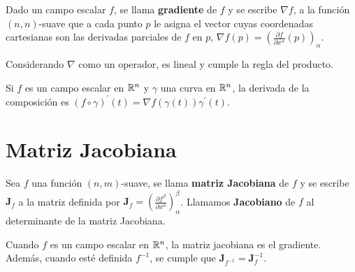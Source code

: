 \begin{definition}
  Dado un campo escalar $f$, se llama \textbf{gradiente}\label{def:gradiente} de $f$ y se escribe $\nabla
  f$, a la función $(n,n)$-suave que a cada punto $p$ le asigna el vector cuyas
  coordenadas cartesianas son las derivadas parciales de $f$ en $p$, $\nabla f(p)=\left({\frac
  {\partial f}{\partial x^\alpha}}(p)\right)_\alpha$.
\end{definition}

Considerando $\nabla$ como un operador, es lineal y cumple la regla del producto.

\begin{theorem}\label{th:regla-cadena}
  Si $f$ es un campo escalar en $\mathbb{R}^n$ y $\gamma$ una curva en $\mathbb{R}^n$, la derivada de la composición
es $(f\circ\gamma)^{'}(t)=\nabla f(\gamma(t))\gamma^{'}(t)$.
\end{theorem}

\section{Matriz Jacobiana}\label{sec:matriz-jacobiana}
\begin{definition}
  Sea $f$ una función $(n,m)$-suave, se llama \textbf{matriz
  Jacobiana}\label{def:matriz-jacobiana} de $f$ y se escribe $\mathbf{J}_f$ a la matriz
  definida por
  $\mathbf{J}_f=\left({\frac {\partial f^\beta}{\partial x^\alpha}}\right)_\alpha^\beta$.
  Llamamos \textbf{Jacobiano}\label{def:jacobiano} de $f$ al determinante de la matriz Jacobiana.
\end{definition}
Cuando $f$ es un campo escalar en $\mathbb{R}^n$, la matriz jacobiana es el gradiente.
Además, cuando esté definida $f^{-1}$, se cumple que $\mathbf{J}_{f^{-1}}=\mathbf{J}_f^{-1}$.
